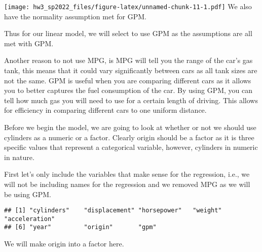 \documentclass[
]{article}
\newenvironment{Shaded}{\begin{snugshade}}{\end{snugshade}}
\newcommand{\CommentTok}[1]{\textcolor[rgb]{0.56,0.35,0.01}{\textit{#1}}}
\newcommand{\FunctionTok}[1]{\textcolor[rgb]{0.00,0.00,0.00}{#1}}
\newcommand{\NormalTok}[1]{#1}
\newcommand{\OtherTok}[1]{\textcolor[rgb]{0.56,0.35,0.01}{#1}}
\newcommand{\SpecialCharTok}[1]{\textcolor[rgb]{0.00,0.00,0.00}{#1}}
\newcommand{\StringTok}[1]{\textcolor[rgb]{0.31,0.60,0.02}{#1}}
\begin{document}
\texttt{[image: hw3\_sp2022\_files/figure-latex/unnamed-chunk-11-1.pdf]}
We also have the normality assumption met for GPM.

Thus for our linear model, we will select to use GPM as the assumptions
are all met with GPM.

Another reason to not use MPG, is MPG will tell you the range of the
car's gas tank, this means that it could vary significantly between cars
as all tank sizes are not the same. GPM is useful when you are comparing
different cars as it allows you to better captures the fuel consumption
of the car. By using GPM, you can tell how much gas you will need to use
for a certain length of driving. This allows for efficiency in comparing
different cars to one uniform distance.

Before we begin the model, we are going to look at whether or not we
should use cylinders as a numeric or a factor. Clearly origin should be
a factor as it is three specific values that represent a categorical
variable, however, cylinders in numeric in nature.

First let's only include the variables that make sense for the
regression, i.e., we will not be including names for the regression and
we removed MPG as we will be using GPM.

\begin{Shaded}
\end{Shaded}

\begin{verbatim}
## [1] "cylinders"    "displacement" "horsepower"   "weight"       "acceleration"
## [6] "year"         "origin"       "gpm"
\end{verbatim}

We will make origin into a factor here.

\begin{Shaded}
\end{Shaded}
\end{document}
